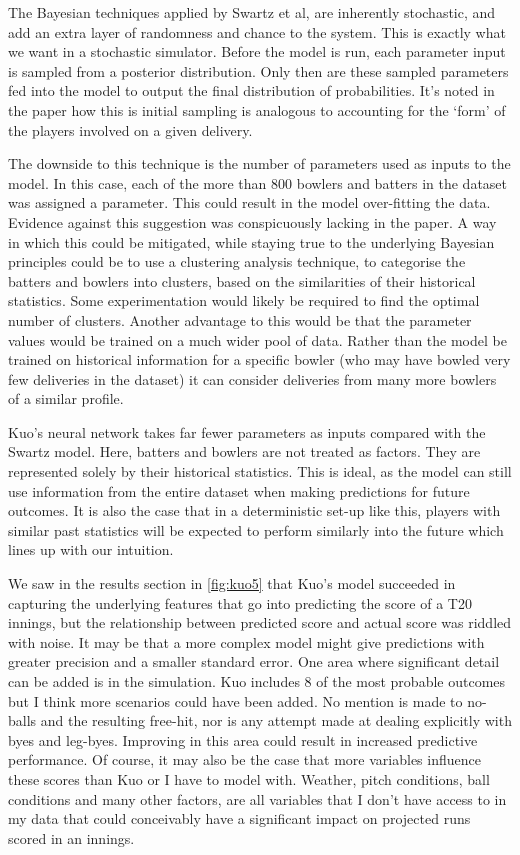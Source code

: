 The Bayesian techniques applied by Swartz et al, are inherently stochastic, and add an extra layer of randomness and chance to the system. This is exactly what we want in a stochastic simulator. Before the model is run, each parameter input is sampled from a posterior distribution. Only then are these sampled parameters fed into the model to output the final distribution of probabilities. It’s noted in the paper how this is initial sampling is analogous to accounting for the ‘form’ of the players involved on a given delivery.

The downside to this technique is the number of parameters used as inputs to the model. In this case, each of the more than 800 bowlers and batters in the dataset was assigned a parameter. This could result in the model over-fitting the data. Evidence against this suggestion was conspicuously lacking in the paper. A way in which this could be mitigated, while staying true to the underlying Bayesian principles could be to use a clustering analysis technique, to categorise the batters and bowlers into clusters, based on the similarities of their historical statistics. Some experimentation would likely be required to find the optimal number of clusters. Another advantage to this would be that the parameter values would be trained on a much wider pool of data. Rather than the model be trained on historical information for a specific bowler (who may have bowled very few deliveries in the dataset) it can consider deliveries from many more bowlers of a similar profile.

Kuo’s neural network takes far fewer parameters as inputs compared with the Swartz model. Here, batters and bowlers are not treated as factors. They are represented solely by their historical statistics. This is ideal, as the model can still use information from the entire dataset when making predictions for future outcomes. It is also the case that in a deterministic set-up like this, players with similar past statistics will be expected to perform similarly into the future which lines up with our intuition. 

We saw in the results section in \autoref{fig:kuo5} that Kuo’s model succeeded in capturing the underlying features that go into predicting the score of a T20 innings, but the relationship between predicted score and actual score was riddled with noise. It may be that a more complex model might give predictions with greater precision and a smaller standard error. One area where significant detail can be added is in the simulation. Kuo includes 8 of the most probable outcomes but I think more scenarios could have been added. No mention is made to no-balls and the resulting free-hit, nor is any attempt made at dealing explicitly with byes and leg-byes. Improving in this area could result in increased predictive performance. Of course, it may also be the case that more variables influence these scores than Kuo or I have to model with. Weather, pitch conditions, ball conditions\footnotemark{} and many other factors, are all variables that I don’t have access to in my data that could conceivably have a significant impact on projected runs scored in an innings.

